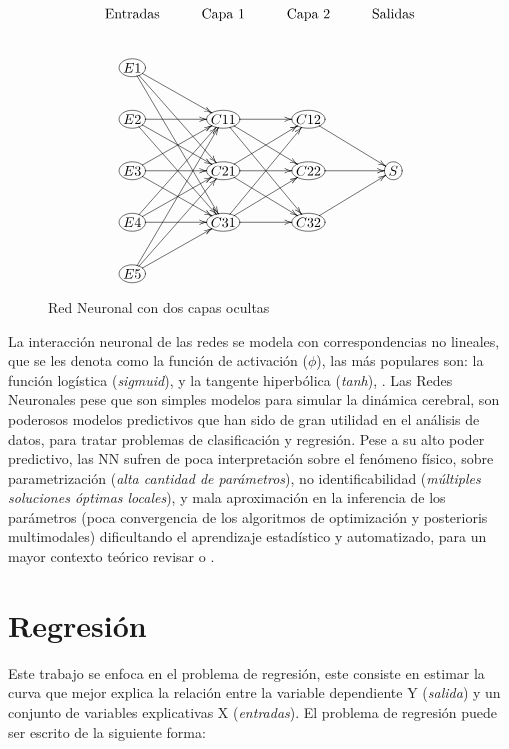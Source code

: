 \documentclass[nojss]{jss}
\begin{document}
\begin{figure}[H]
\centering
$$
\xymatrix{
	\text{Entradas}                     &  \text{Capa 1}                   & \text{Capa 2}      &\text{Salidas}\\
	*+[o][F]{E1}\ar[dr]\ar[ddr]\ar[dddr]&                                  &                    & \\
	*+[o][F]{E2}\ar[r] \ar[dr] \ar[ddr] &*+[o][F]{C11}\ar[r]\ar[dr]\ar[ddr]&*+[o][F]{C12}\ar[dr]& \\
	*+[o][F]{E3}\ar[dr]\ar[ur] \ar[r]   &*+[o][F]{C21}\ar[r]\ar[ur]\ar[dr] &*+[o][F]{C22}\ar[r] & *+[o][F]{S}\\
	*+[o][F]{E4}\ar[r] \ar[ur] \ar[uur] &*+[o][F]{C31}\ar[ur]\ar[r]\ar[uur]&*+[o][F]{C32}\ar[ur]& \\	
	*+[o][F]{E5}\ar[ur]\ar[uur]\ar[uuur]&                                  &                    & \\		
}
$$
\caption[Red Neuronal]{Red Neuronal con dos capas ocultas}
\label{fig:fig1}
\end{figure}

La interacción neuronal de las redes se modela con correspondencias no lineales, que se les denota como la función de activación ($\phi$), las más populares son: la función logística (\textit{sigmuid}), y la  tangente hiperbólica (\textit{tanh}), \cite{Bhat2006}. Las Redes Neuronales pese que son simples modelos para simular la dinámica cerebral, son poderosos modelos predictivos que han sido de gran utilidad en el análisis de datos, para tratar problemas de clasificación y regresión. Pese a su alto poder predictivo, las NN sufren de poca interpretación sobre el fenómeno físico,  sobre parametrización (\textit{alta cantidad de parámetros}), no identificabilidad (\textit{múltiples soluciones óptimas locales}), y mala aproximación en la inferencia de los parámetros (poca convergencia de los algoritmos de optimización y posterioris multimodales) dificultando el aprendizaje estadístico y automatizado, para un mayor contexto teórico revisar \cite{tensorflow2015} o \cite{haykin2009}. 

\section{Regresión}

Este trabajo se enfoca en el problema de regresión, este consiste en estimar la curva que mejor explica la relación entre la variable dependiente Y (\textit{salida}) y un conjunto de variables explicativas X (\textit{entradas}). El problema de regresión puede ser escrito de la siguiente forma:
\end{document}
